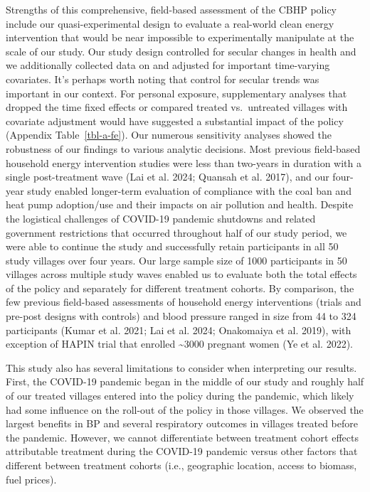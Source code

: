 \documentclass[
  letterpaper,
  DIV=11,
  numbers=noendperiod]{scrartcl}
\begin{document}
Strengths of this comprehensive, field-based assessment of the CBHP
policy include our quasi-experimental design to evaluate a real-world
clean energy intervention that would be near impossible to
experimentally manipulate at the scale of our study. Our study design
controlled for secular changes in health and we additionally collected
data on and adjusted for important time-varying covariates. It's perhaps
worth noting that control for secular trends was important in our
context. For personal exposure, supplementary analyses that dropped the
time fixed effects or compared treated vs.~untreated villages with
covariate adjustment would have suggested a substantial impact of the
policy (Appendix Table~\ref{tbl-a-fe}). Our numerous sensitivity
analyses showed the robustness of our findings to various analytic
decisions. Most previous field-based household energy intervention
studies were less than two-years in duration with a single
post-treatment wave (Lai et al. 2024; Quansah et al. 2017), and our
four-year study enabled longer-term evaluation of compliance with the
coal ban and heat pump adoption/use and their impacts on air pollution
and health. Despite the logistical challenges of COVID-19 pandemic
shutdowns and related government restrictions that occurred throughout
half of our study period, we were able to continue the study and
successfully retain participants in all 50 study villages over four
years. Our large sample size of 1000 participants in 50 villages across
multiple study waves enabled us to evaluate both the total effects of
the policy and separately for different treatment cohorts. By
comparison, the few previous field-based assessments of household energy
interventions (trials and pre-post designs with controls) and blood
pressure ranged in size from 44 to 324 participants (Kumar et al. 2021;
Lai et al. 2024; Onakomaiya et al. 2019), with exception of HAPIN trial
that enrolled \textasciitilde3000 pregnant women (Ye et al. 2022).

This study also has several limitations to consider when interpreting
our results. First, the COVID-19 pandemic began in the middle of our
study and roughly half of our treated villages entered into the policy
during the pandemic, which likely had some influence on the roll-out of
the policy in those villages. We observed the largest benefits in BP and
several respiratory outcomes in villages treated before the pandemic.
However, we cannot differentiate between treatment cohort effects
attributable treatment during the COVID-19 pandemic versus other factors
that different between treatment cohorts (i.e., geographic location,
access to biomass, fuel prices).
\end{document}

